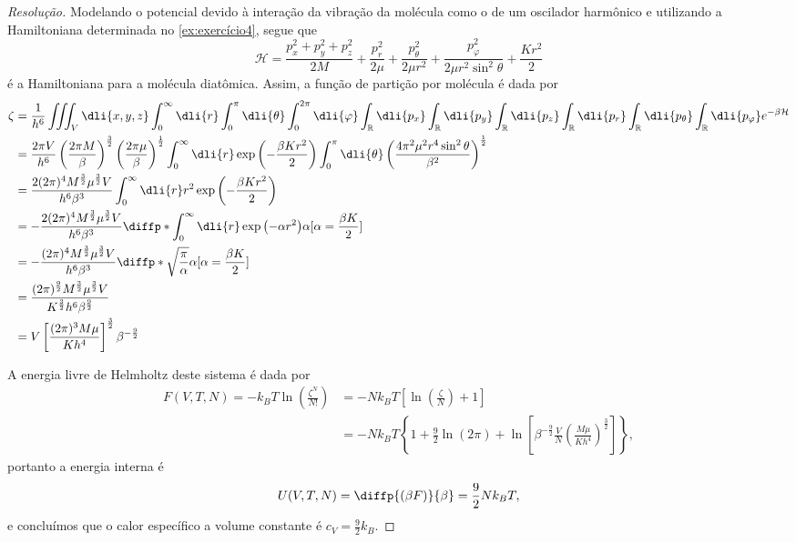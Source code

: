 \begin{proof}[Resolução]
    Modelando o potencial devido à interação da vibração da molécula como o de um oscilador harmônico e utilizando a Hamiltoniana determinada no \cref{ex:exercício4}, segue que
    \begin{equation*}
        \mathcal{H} = \frac{p_x^2 + p_y^2 + p_z^2}{2M} + \frac{p_r^2}{2\mu} + \frac{p_\theta^2}{2\mu r^2} + \frac{p_{\varphi}^2}{2\mu r^2 \sin^2\theta} + \frac{Kr^2}{2}
    \end{equation*}
    é a Hamiltoniana para a molécula diatômica. Assim, a função de partição por molécula é dada por
    \begin{align*}
        \zeta &= \frac{1}{h^6}\iiint_V \dli{x,y,z}\int_{0}^{\infty}\dli{r} \int_0^{\pi}\dli{\theta}\int_0^{2\pi} \dli{\varphi} \int_{\mathbb{R}}\dli{p_x}\int_{\mathbb{R}} \dli{p_y} \int_{\mathbb{R}}\dli{p_z}\int_{\mathbb{R}}\dli{p_r}\int_{\mathbb{R}}\dli{p_\theta} \int_{\mathbb{R}}\dli{p_{\varphi}} e^{-\beta \mathcal{H}}\\
              &= \frac{2\pi V}{h^6}\left(\frac{2\pi M}{\beta}\right)^{\frac32}\left(\frac{2\pi \mu}{\beta}\right)^{\frac12}\int_0^\infty \dli{r}\exp\left(-\frac{\beta K r^2}{2}\right)\int_0^{\pi}\dli{\theta} \left(\frac{4\pi^2\mu^2r^4\sin^2\theta}{\beta^2}\right)^{\frac12}\\
              &= \frac{2(2\pi)^4M^{\frac32}\mu^{\frac32}V}{h^6\beta^3} \int_0^\infty \dli{r} r^2 \exp\left(-\frac{\beta K r^2}{2}\right)\\
              &= -\frac{2(2\pi)^4M^{\frac32}\mu^{\frac32}V}{h^6\beta^3} \diffp*{\int_0^\infty \dli{r} \exp\left(-\alpha r^2\right)}{\alpha}[\alpha = \frac{\beta K}{2}]\\
              &= -\frac{(2\pi)^4M^{\frac32}\mu^{\frac32}V}{h^6\beta^3} \diffp*{\sqrt{\frac{\pi}{\alpha}}}{\alpha}[\alpha = \frac{\beta K}{2}]\\
              &= \frac{(2\pi)^{\frac92}M^{\frac32}\mu^{\frac32}V}{K^{\frac32}h^6\beta^{\frac92}}\\
              &= V \left[\frac{(2\pi)^3M \mu}{Kh^4}\right]^{\frac32} \beta^{-\frac92}
    \end{align*}

    A energia livre de Helmholtz deste sistema é dada por
    \begin{align*}
        F(V, T, N) = -k_BT\ln\left(\frac{\zeta^N}{N!}\right)
        &= -Nk_BT \left[ \ln\left(\frac{\zeta}{N}\right) + 1\right]\\
        &= - N k_B T \left\{1 + \frac92 \ln(2\pi) + \ln\left[\beta^{-\frac92}\frac{V}{N}\left(\frac{M\mu}{K h^4}\right)^{\frac32}\right]\right\},
    \end{align*}
    portanto a energia interna é
    \begin{equation*}
        U(V, T, N) = \diffp{(\beta F)}{\beta} = \frac92 Nk_B T,
    \end{equation*}
    e concluímos que o calor específico a volume constante é \(c_V = \frac92 k_B\).


\end{proof}
